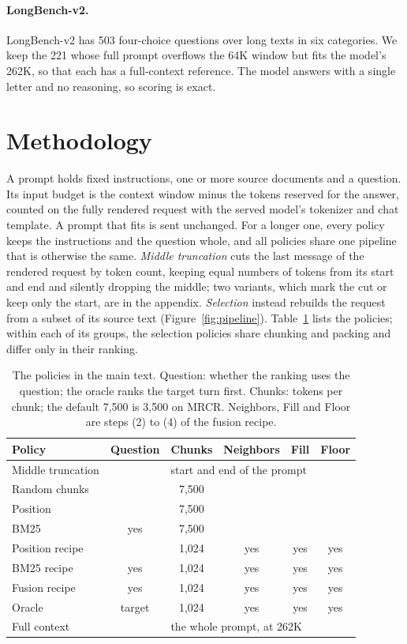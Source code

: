 \documentclass[letterpaper]{article} %
\newcommand{\recipe}{fusion recipe}
\begin{document}
\paragraph{LongBench-v2.} LongBench-v2 \cite{bai2025longbenchv2} has 503 four-choice questions over long texts in six categories. We keep the 221 whose full prompt overflows the 64K window but fits the model's 262K, so that each has a full-context reference. The model answers with a single letter and no reasoning, so scoring is exact.

\section{Methodology}
A prompt holds fixed instructions, one or more source documents and a question. Its input budget is the context window minus the tokens reserved for the answer, counted on the fully rendered request with the served model's tokenizer and chat template. A prompt that fits is sent unchanged. For a longer one, every policy keeps the instructions and the question whole, and all policies share one pipeline that is otherwise the same. \emph{Middle truncation} cuts the last message of the rendered request by token count, keeping equal numbers of tokens from its start and end and silently dropping the middle; two variants, which mark the cut or keep only the start, are in the appendix. \emph{Selection} instead rebuilds the request from a subset of its source text (Figure~\ref{fig:pipeline}). Table~\ref{tab:policies} lists the policies; within each of its groups, the selection policies share chunking and packing and differ only in their ranking.

\begin{table}[t]
\centering
\small
\setlength{\tabcolsep}{3pt}
\begin{tabular}{lccccc}
\toprule
Policy & Question & Chunks & Neighbors & Fill & Floor \\
\midrule
Middle truncation & & \multicolumn{4}{l}{start and end of the prompt} \\
\addlinespace
Random chunks & & 7,500 & & & \\
Position & & 7,500 & & & \\
BM25 & yes & 7,500 & & & \\
\addlinespace
Position recipe & & 1,024 & yes & yes & yes \\
BM25 recipe & yes & 1,024 & yes & yes & yes \\
Fusion recipe & yes & 1,024 & yes & yes & yes \\
Oracle & target & 1,024 & yes & yes & yes \\
\addlinespace
Full context & & \multicolumn{4}{l}{the whole prompt, at 262K} \\
\bottomrule
\end{tabular}
\caption{The policies in the main text. Question: whether the ranking uses the question; the oracle ranks the target turn first. Chunks: tokens per chunk; the default 7,500 is 3,500 on MRCR. Neighbors, Fill and Floor are steps (2) to (4) of the \recipe.}
\label{tab:policies}
\end{table}
\end{document}
